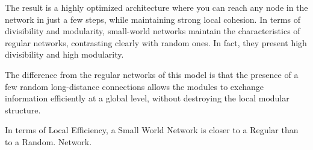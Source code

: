 \documentclass[10pt, letterpaper]{report}
\begin{document}
The result is a highly optimized architecture where you can reach any node in the network in just a few steps, while maintaining strong local cohesion. In terms of divisibility and modularity, small-world networks maintain the characteristics of regular networks, contrasting clearly with random ones. In fact, they present high divisibility and high modularity. 

The difference from the regular networks of this model is that the presence of a few random long-distance connections allows the modules to exchange information efficiently at a global level, without destroying the local modular structure.\begin{boxobservation}{}{}
     In terms of Local Efficiency, a Small World Network is closer to a Regular than to a Random.
Network.
\end{boxobservation}
\end{document}
